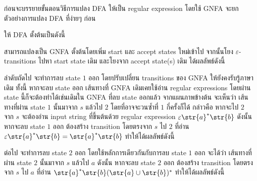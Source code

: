 ก่อนจะบรรยายขั้นตอนวิธีการแปลง DFA ให้เป็น regular expression โดยใช้ GNFA จะยกตัวอย่างการแปลง DFA ที่ง่ายๆ ก่อน
\begin{example}
ให้ DFA ตั้งต้นเป็นดังนี้
\begin{center}
\end{center}
สามารถแปลงเป็น GNFA ตั้งต้นโดยเพิ่ม start และ accept states ใหม่เข้าไป จากนั้นโยง $\varepsilon$-transitions ไปหา start state เดิม และโยงจาก accept state(s) เดิม ได้ผลลัพธ์ดังนี้
\begin{center}
\end{center}
ลำดับถัดไป จะทำการลบ state $1$ ออก โดยปรับเปลี่ยน transitions ของ GNFA ให้ยังคงรับรู้ภาษาเดิม \enskip ทั้งนี้ หากจะลบ state ออก เส้นทางที่ GNFA เดิมเคยใช้อ่าน regular expressions โดยผ่าน state นี้ก็จะต้องทำได้เช่นเดิมใน GNFA ที่ลบ state ออกแล้ว \enskip จากแผนภาพข้างต้น จะเห็นว่า เส้นทางที่ผ่าน state $1$ นั้นมาจาก $s$ แล้วไป $2$ โดยที่อาจจะวนซ้ำที่ $1$ กี่ครั้งก็ได้ กล่าวคือ หากจะไป $2$ จาก $s$ จะต้องอ่าน input string ที่ขึ้นต้นด้วย regular expression $\varepsilon\str{a}^*\str{b}$ \enskip ดังนั้น หากจะลบ state $1$ ออก ต้องสร้าง transition โดยตรงจาก $s$ ไป $2$ ที่อ่าน $\varepsilon\str{a}^*\str{b}=\str{a}^*\str{b}$ ทำให้ได้ผลลัพธ์ดังนี้
\begin{center}
\end{center}
ต่อไป จะทำการลบ state $2$ ออก โดยใช้หลักการเดียวกันกับการลบ state $1$ ออก \enskip จะได้ว่า เส้นทางที่ผ่าน state $2$ นั้นมาจาก $s$ แล้วไป $a$ \enskip ดังนั้น หากจะลบ state $2$ ออก ต้องสร้าง transition โดยตรงจาก $s$ ไป $a$ ที่อ่าน $\str{a}^*\str{b}(\str{a}\cup\str{b})^*$ ทำให้ได้ผลลัพธ์ดังนี้
\begin{center}
\end{center}
\end{example}

